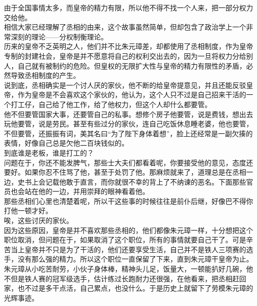 \begin{multicols}{\theparacolNo}
由于全国事情太多，而皇帝的精力有限，所以他不得不找一个人来，把一部分权力交给他。\\

相信大家已经理解了丞相的由来，这个故事虽然简单，但却包含了政治学上一个非常深刻的理论——分权制衡理论。\\

历来的皇帝不乏英明之人，他们并不比朱元璋差，却都使用了丞相制度，作为皇帝专制的封建社会，皇帝是并不愿意将自己的权利交出去的，因为一旦将权力分给别人，自己就有被制约的危险。但皇权的无限扩大性与皇帝的精力有限性的矛盾，必然导致丞相制度的产生。\\

说到底，丞相确实是一个讨人厌的家伙，他不断的给皇帝提意见，并且还能反驳皇帝，作为皇帝是不会喜欢这个家伙的，他认为，这个人只不过是自己招来干活的一个打工仔，自己给了他工作，给了他权力，但这个人却什么都要管。\\

他不但要管国家大事，还要管自己的私事。想修个房子他要管，说是费钱，想出去玩他要管，说是劳民。甚至有些过分的家伙，连自己吃饭休息睡老婆，他也要管，不但要管，还振振有词，美其名曰“为了陛下身体着想”，脸上还经常是一副欠揍的表情，好像自己总是欠他二百块钱似的。\\

到底谁是老板，谁是打工的？\\

问题在于，你还不能发脾气，那些士大夫们都看着呢，你要接受他的意见，态度还要好。如果你忍不住骂了他，甚至于处罚了他。那麻烦就来了，道理总是在丞相一边，史书上会记载他敢于直言，而你就很不幸的背上了不纳谏的恶名。下面那些官员也会站在他的一边，并用崇拜的眼神看着他。\\

那些丞相们心里也清楚着呢，所以干这些事的时候往往是前仆后继，好像巴不得你打他一顿才好。\\

唉，这些讨厌的家伙。\\

因为这些原因，皇帝是并不喜欢那些丞相的，他们都像朱元璋一样，十分想把这个职位取消，但问题在于，如果取消了这个职位，所有的事情就要自己干了。可是辛苦当上皇帝并不只是为了干活的，他们还要享受生活，自己并不是铁人三项赛的选手，没有那么强的精力。所以这个职位一直保留了下来，直到朱元璋干皇帝为止。\\

朱元璋从小吃苦耐劳，小伙子身体棒，精神头儿足，饭量大，一顿能扒好几碗，他不但是铁人赛的冠军级选手，估计练过长跑耐力还很强，在他看来，把丞相赶回家，也不过是多干点活，自己累点，也没什么。于是历史上就留下了劳模朱元璋的光辉事迹。\\


\end{multicols}
